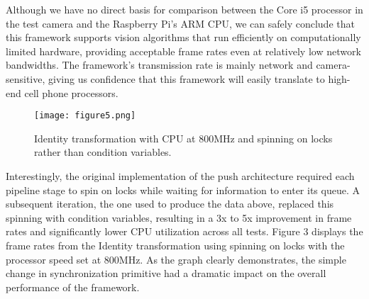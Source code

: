 Although we have no direct basis for comparison between the Core i5 processor in the
test camera and the Raspberry Pi's ARM CPU, we can safely conclude that this framework
supports vision algorithms that run efficiently on computationally limited hardware, providing
acceptable frame rates even at relatively low network bandwidths.  The framework's transmission rate
is mainly network and camera-sensitive, giving us confidence that
this framework  will easily translate to high-end cell phone processors.

\begin{figure}
\texttt{[image: figure5.png]}
\caption{Identity transformation with CPU at 800MHz and spinning on locks rather than condition variables.}
\end{figure}

Interestingly, the original implementation of the push architecture required each pipeline stage to
spin on locks while waiting for information to enter its queue.  A subsequent iteration, the
one used to produce the data above, replaced this spinning with condition variables, resulting
in a 3x to 5x improvement in frame rates and significantly lower CPU utilization across all tests.
Figure 3 displays the frame rates from the Identity transformation using spinning on locks with
the processor speed set at 800MHz.  As
the graph clearly demonstrates, the simple change in synchronization primitive had a dramatic impact on
the overall performance of the framework.
